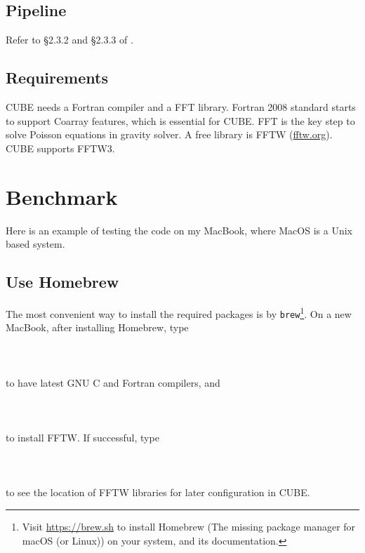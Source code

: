 \documentclass[12pt]{article}
\begin{document}
\subsection{Pipeline}

Refer to \S 2.3.2 and \S 2.3.3 of \cite{2018ApJS..237...24Y}.

\subsection{Requirements}

CUBE needs a Fortran compiler and a FFT library. Fortran 2008 standard starts to support Coarray features, which is essential for CUBE. FFT is the key step to solve Poisson equations in gravity solver. A free library is FFTW (\url{fftw.org}). CUBE supports FFTW3.

\section{Benchmark}
Here is an example of testing the code on my MacBook, where MacOS is a Unix based system. 

\subsection{Use Homebrew}

The most convenient way to install the required packages is by {\tt brew}\footnote{Visit \url{https://brew.sh} to install Homebrew (The missing package manager for macOS (or Linux)) on your system, and its documentation.}. On a new MacBook, after installing Homebrew, type
\\\\
 \\
\\
to have latest GNU C and Fortran compilers, and
\\\\
 \\
\\
to install FFTW. If successful, type
\\\\
 \\
\\
to see the location of FFTW libraries for later configuration in CUBE.
\end{document}
